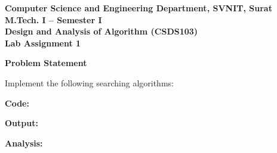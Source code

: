 \documentclass[12pt]{article}
\begin{document}

\begin{center}
\textbf{Computer Science and Engineering Department, SVNIT, Surat}\\
\textbf{M.Tech. I -- Semester I}\\
\textbf{Design and Analysis of Algorithm (CSDS103)}\\
\textbf{Lab Assignment 1}
\end{center}

\vspace{0.4cm}


\textbf{Problem Statement}

Implement the following searching algorithms:

\vspace{0.3cm}

\textbf{Code:}

\newpage

\textbf{Output:}

\newpage

\textbf{Analysis:}

\vspace{6cm}
\end{document}
